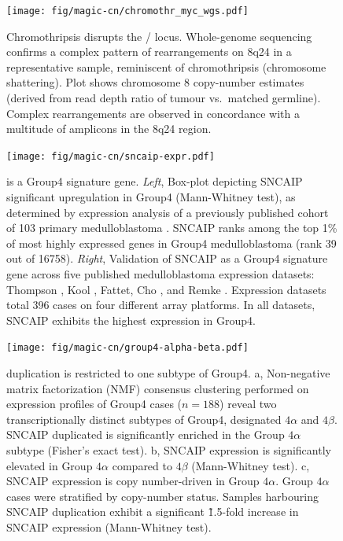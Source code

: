 \begin{figure}[b]
	\begin{center}
		\texttt{[image: fig/magic-cn/chromothr\_myc\_wgs.pdf]}
	\end{center}
	\caption[Chromothripsis disrupts the / locus.]
	{
		Chromothripsis disrupts the / locus.
		Whole-genome sequencing confirms a complex pattern of rearrangements on 8q24 in a representative sample, reminiscent of chromothripsis (chromosome shattering).
		Plot shows chromosome 8 copy-number estimates (derived from read depth ratio of tumour vs.\ matched germline).
		Complex rearrangements are observed in concordance with a multitude of amplicons in the 8q24 region.
	}
	\label{fig:chromothr_myc_wgs}
\end{figure}

\begin{figure}[t]
	\begin{center}
		\texttt{[image: fig/magic-cn/sncaip-expr.pdf]}
	\end{center}
	\caption[ is a Group4 signature gene]
	{
	 is a Group4 signature gene.
	\emph{Left}, Box-plot depicting SNCAIP significant upregulation in Group4 (Mann-Whitney test), as determined by expression analysis of a previously published cohort of 103 primary medulloblastoma . SNCAIP ranks among the top 1\% of most highly expressed genes in Group4 medulloblastoma (rank 39 out of 16758).
	\emph{Right}, Validation of SNCAIP as a Group4 signature gene across five published medulloblastoma expression datasets: Thompson , Kool , Fattet, Cho , and Remke . Expression datasets total 396 cases on four different array platforms. In all datasets, SNCAIP exhibits the highest expression in Group4.
	}
	\label{fig:sncaip-expr}
\end{figure}

\begin{figure}[b]
	\begin{center}
		\texttt{[image: fig/magic-cn/group4-alpha-beta.pdf]}
	\end{center}
	\caption[ duplication is restricted to one subtype of Group4]
	{
	 duplication is restricted to one subtype of Group4.
	\textsf{a}, Non-negative matrix factorization (NMF) consensus clustering performed on expression profiles of Group4 cases ($n = 188$) reveal two transcriptionally distinct subtypes of Group4, designated $4\alpha$ and $4\beta$. SNCAIP duplicated is significantly enriched in the Group $4\alpha$ subtype (Fisher's exact test).
	\textsf{b}, SNCAIP expression is significantly elevated in Group $4\alpha$ compared to $4\beta$ (Mann-Whitney test).
	\textsf{c}, SNCAIP expression is copy number-driven in Group $4\alpha$. Group $4\alpha$ cases were stratified by  copy-number status. Samples harbouring SNCAIP duplication exhibit a significant \~1.5-fold increase in SNCAIP expression (Mann-Whitney test).
	}
	\label{fig:group4-alpha-beta}
\end{figure}

